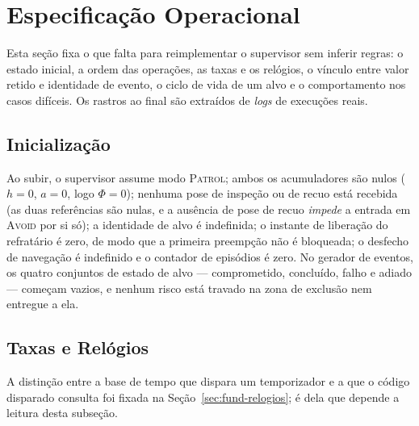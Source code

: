 \section{Especificação Operacional}
\label{sec:prop-especificacao}

Esta seção fixa o que falta para reimplementar o supervisor sem inferir regras: o
estado inicial, a ordem das operações, as taxas e os relógios, o vínculo entre valor
retido e identidade de evento, o ciclo de vida de um alvo e o comportamento nos casos
difíceis. Os rastros ao final são extraídos de \textit{logs} de execuções reais.

\subsection{Inicialização}

Ao subir, o supervisor assume modo \textsc{Patrol}; ambos os acumuladores são nulos
($h=0$, $a=0$, logo $\Phi=0$); nenhuma pose de inspeção ou de recuo está recebida (as
duas referências são nulas, e a ausência de pose de recuo \emph{impede} a entrada em
\textsc{Avoid} por si só); a identidade de alvo é indefinida; o instante de liberação
do refratário é zero, de modo que a primeira preempção não é bloqueada; o desfecho de
navegação é indefinido e o contador de episódios é zero. No gerador de eventos, os
quatro conjuntos de estado de alvo --- comprometido, concluído, falho e adiado ---
começam vazios, e nenhum risco está travado na zona de exclusão nem entregue a ela.

\subsection{Taxas e Relógios}
\label{sec:prop-relogios}

A distinção entre a base de tempo que dispara um temporizador e a que o código disparado
consulta foi fixada na Seção~\ref{sec:fund-relogios}; é dela que depende a leitura desta
subseção.

